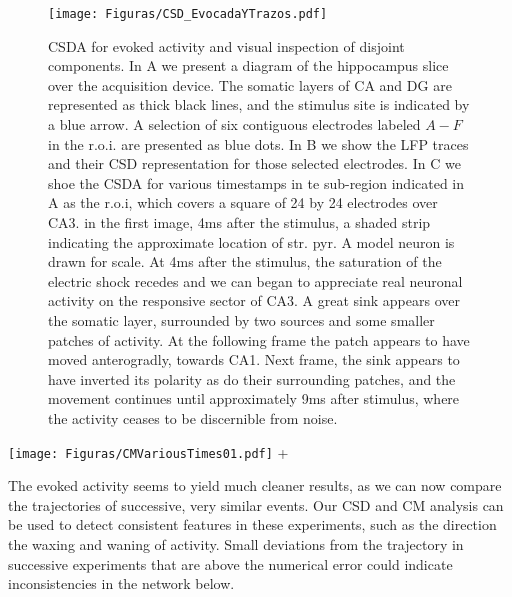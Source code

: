 \documentclass[12pt]{article}
\begin{document}
\begin{figure}[h]
  \texttt{[image: Figuras/CSD\_EvocadaYTrazos.pdf]}
  \caption{ CSDA for evoked activity and visual inspection of disjoint
    components. In A we present a diagram of the hippocampus slice over
    the acquisition device. The somatic layers of CA and DG are represented as
    thick black lines, and the stimulus site is indicated by a blue arrow. A selection
    of six contiguous electrodes labeled $A-F$ in the r.o.i. are presented as blue
    dots. In B we show the LFP traces and their CSD representation for those
    selected electrodes.
    In C we shoe the CSDA for various timestamps in te sub-region
    indicated in A as the r.o.i, which covers a square of 24 by 24 electrodes over CA3.
    in the first image,  4ms after the stimulus,  a
    shaded strip indicating the approximate location of str. pyr. A model neuron is
    drawn for scale. At 4ms after the stimulus, the saturation of the electric shock
    recedes and we can began to appreciate real neuronal activity on the responsive
    sector of CA3. A great sink appears over the somatic layer, surrounded by two
    sources and some smaller patches of activity. At the following frame the patch
    appears to have moved anterogradly, towards CA1. Next frame, the sink appears
    to have inverted its polarity as do their surrounding patches, and the movement
    continues until approximately 9ms after stimulus, where the activity ceases to be
    discernible from noise.}
  \label{CSD_Evocada01}
\end{figure}


 \texttt{[image: Figuras/CMVariousTimes01.pdf]}
+  \caption{ The CM analysis over the same images as figure \ref{CSD_Evocada01} C. Some trajectories
+    are calculated before the 4ms time stamp. The triangular mark shows the later point of the
+    trajectory, either the end or the last calculated position until that moment. The circular
+    mark is the start of the trajectory. We can see that activity moves form CA3 distal to
+    proximal in alternating waves of action (hiperpolarization, firing and repolarization).
+  }\label{cmevocada}


The evoked activity seems to yield much cleaner results, as we can now compare the trajectories of successive, very similar events. Our CSD and CM analysis can be used to detect consistent features in these experiments, such as the direction the waxing and waning of activity. Small deviations from the trajectory in successive experiments that are above the numerical error could indicate inconsistencies in the network below. 
\end{document}
